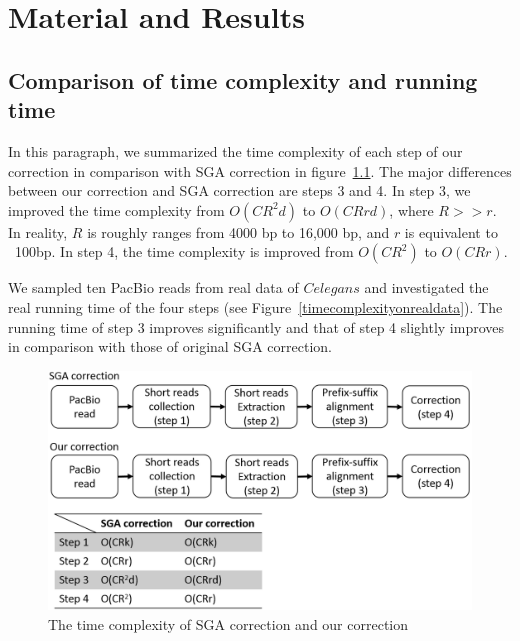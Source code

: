 \chapter{Material and Results}

\section{Comparison of time complexity and running time}


In this paragraph, we summarized the time complexity of each step of our correction in comparison with SGA correction in figure~\ref{timecomplexity}. The major differences between our correction and SGA correction are steps 3 and 4. In step 3, we improved the time complexity from $O(CR^{2}d)$ to $O(CRrd)$, where $R>>r$. In reality, $R$ is roughly ranges from 4000 bp to 16,000 bp, and $r$ is equivalent to ~100bp. In step 4, the time complexity is improved from $O(CR^2)$ to $O(CRr)$.

We sampled ten PacBio reads from real data of $C elegans$ and investigated the real running time of the four steps (see Figure~\ref{timecomplexityonrealdata}). The running time of step 3 improves significantly and that of step 4 slightly improves in comparison with those of original SGA correction. 

\newpage

\begin{figure} [h]
\centering
\includegraphics[scale=0.45]{Figures/chapter4/timecomplexity.png}
\caption{The time complexity of SGA correction and our correction}
\label{timecomplexity}
\end{figure}

